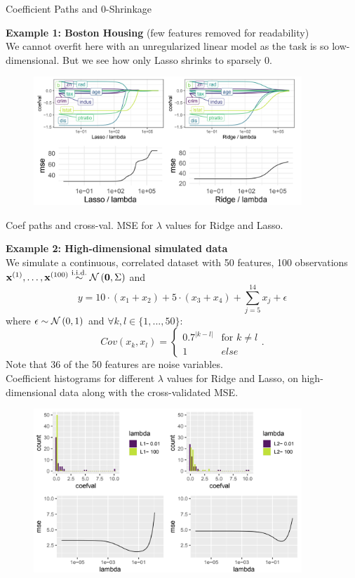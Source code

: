 \begin{vbframe}{Coefficient Paths and 0-Shrinkage}

\textbf{Example 1: Boston Housing} (few features removed for readability) \\

We cannot overfit here with an unregularized linear model as the task is so low-dimensional. But we see how only Lasso shrinks to sparsely 0.

\begin{figure}
\includegraphics[width=0.9\textwidth]{figure_man/0shrinkage-01.png}\\
\end{figure}

Coef paths and cross-val. MSE for $\lambda$ values for Ridge and Lasso.

\framebreak
\textbf{Example 2: High-dimensional simulated data} \\
We simulate a continuous, correlated dataset with 50 features, 100 observations $\mathbf{x}^{(1)},\dots, \mathbf{x}^{(100)} \overset{\text{i.i.d.}}{\sim} \mathcal{N} \left(\mathbf{0}, \Sigma \right)$ and
$$ y = 10 \cdot (x_1 + x_2) + 5 \cdot (x_3 + x_4) + \sum_{j = 5}^{14} x_j + \epsilon $$
where $\epsilon \sim \mathcal{N} \left(0, 1\right)$ and $ \forall k, l \in \{1, ..., 50\}$:
$$Cov(x_k, x_l) =
  \begin{cases}
   0.7^{|k-l|} & \text{for } k \neq l \\
   1 & else
   \end{cases}.
$$
Note that 36 of the 50 features are noise variables. \\
\framebreak
Coefficient histograms for different $\lambda$ values for Ridge and Lasso, on high-dimensional data along with the cross-validated MSE.

\begin{figure}
\includegraphics[width=0.9\textwidth]{figure_man/0shrinkage-02.png}\\
\end{figure}


\end{vbframe}

